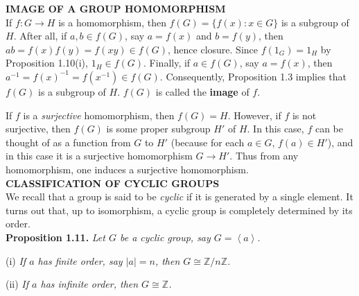 \documentclass[leqno]{book}
\begin{document}
\noindent\textbf{IMAGE OF A GROUP HOMOMORPHISM}\\

\noindent If $f:G\to H$ is a homomorphism, then $f(G)=\{f(x):x\in G\}$ is a subgroup of $H$.  After all, if $a,b\in f(G)$, say $a=f(x)$ and $b=f(y)$, then $ab=f(x)f(y)=f(xy)\in f(G)$, hence closure.  Since $f(1_G)=1_H$ by Proposition 1.10(i), $1_H\in f(G)$.  Finally, if $a\in f(G)$, say $a=f(x)$, then $a^{-1}=f(x)^{-1}=f(x^{-1})\in f(G)$.  Consequently, Proposition 1.3 implies that $f(G)$ is a subgroup of $H$.  $f(G)$ is called the \textbf{image} of $f$.

If $f$ is a \emph{surjective} homomorphism, then $f(G)=H$.  However, if $f$ is not surjective, then $f(G)$ is some proper subgroup $H'$ of $H$.  In this case, $f$ can be thought of as a function from $G$ to $H'$ (because for each $a\in G$, $f(a)\in H'$), and in this case it is a surjective homomorphism $G\to H'$.  Thus from any homomorphism, one induces a surjective homomorphism.\\

\noindent\textbf{CLASSIFICATION OF CYCLIC GROUPS}\\

\noindent We recall that a group is said to be \emph{cyclic} if it is generated by a single element.  It turns out that, up to isomorphism, a cyclic group is completely determined by its order.\\

\noindent\textbf{Proposition 1.11.} \emph{Let $G$ be a cyclic group, say $G=\left<a\right>$.}

(i) \emph{If $a$ has finite order, say $|a|=n$, then $G\cong\mathbb Z/n\mathbb Z$.}

(ii) \emph{If $a$ has infinite order, then $G\cong\mathbb Z$.}\\
\end{document}
